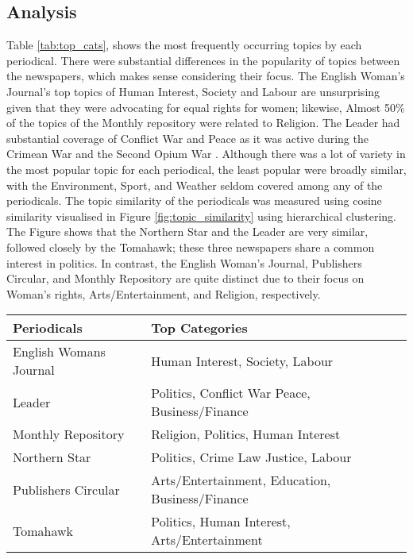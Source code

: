 \documentclass{article} %
\begin{document}
\subsection{Analysis}

Table \ref{tab:top_cats}, shows the most frequently occurring topics by each periodical. There were substantial differences in the popularity of topics between the newspapers, which makes sense considering their focus. The English Woman's Journal's top topics of Human Interest, Society and Labour are unsurprising given that they were advocating for equal rights for women; likewise, Almost 50\% of the topics of the Monthly repository were related to Religion. The Leader had substantial coverage of Conflict War and Peace as it was active during the Crimean War \cite{badem_ottoman_2010, goldfrank_origins_2014} and the Second Opium War \cite{phillips_saving_2012}. Although there was a lot of variety in the most popular topic for each periodical, the least popular were broadly similar, with the Environment, Sport, and Weather seldom covered among any of the periodicals. The topic similarity of the periodicals was measured using cosine similarity visualised in Figure \ref{fig:topic_similarity} using hierarchical clustering. The Figure shows that the Northern Star and the Leader are very similar, followed closely by the Tomahawk; these three newspapers share a common interest in politics. In contrast, the English Woman's Journal, Publishers Circular, and Monthly Repository are quite distinct due to their focus on Woman's rights, Arts/Entertainment, and Religion, respectively.

\begin{table*}
\caption{Most common IPTC topic categories by periodical}
\label{tab:top_cats}
\begin{tabular}{ll}
\toprule
Periodicals & Top Categories \\
\midrule
English Womans Journal & Human Interest, Society, Labour \\
Leader & Politics, Conflict War Peace, Business/Finance \\
Monthly Repository & Religion, Politics, Human Interest \\
Northern Star & Politics, Crime Law Justice, Labour \\
Publishers Circular & Arts/Entertainment, Education, Business/Finance \\
Tomahawk & Politics, Human Interest, Arts/Entertainment \\
\bottomrule
\end{tabular}
\end{table*}
\end{document}
